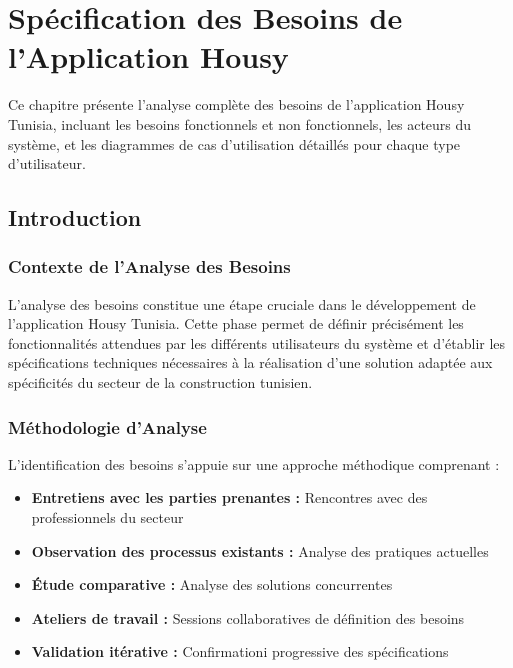 
\chapter{Spécification des Besoins de l'Application Housy}

\begin{objectivebox}
Ce chapitre présente l'analyse complète des besoins de l'application Housy Tunisia, incluant les besoins fonctionnels et non fonctionnels, les acteurs du système, et les diagrammes de cas d'utilisation détaillés pour chaque type d'utilisateur.
\end{objectivebox}


\section{Introduction}

\subsection{Contexte de l'Analyse des Besoins}

L'analyse des besoins constitue une étape cruciale dans le développement de l'application Housy Tunisia. Cette phase permet de définir précisément les fonctionnalités attendues par les différents utilisateurs du système et d'établir les spécifications techniques nécessaires à la réalisation d'une solution adaptée aux spécificités du secteur de la construction tunisien.

\subsection{Méthodologie d'Analyse}

L'identification des besoins s'appuie sur une approche méthodique comprenant :

\begin{itemize}
    \item \textbf{Entretiens avec les parties prenantes :} Rencontres avec des professionnels du secteur
    \item \textbf{Observation des processus existants :} Analyse des pratiques actuelles
    \item \textbf{Étude comparative :} Analyse des solutions concurrentes
    \item \textbf{Ateliers de travail :} Sessions collaboratives de définition des besoins
    \item \textbf{Validation itérative :} Confirmationi progressive des spécifications
\end{itemize}

